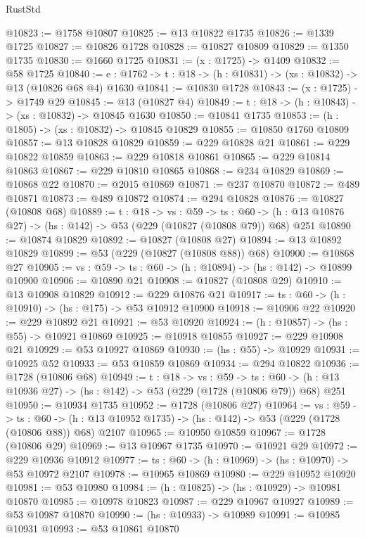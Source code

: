 \begin{lexlean}{RustStd}
\begin{coremodule}
@10823 := @1758 @10807
@10825 := @13 @10822 @1735
@10826 := @1339 @1725
@10827 := @10826 @1728
@10828 := @10827 @10809
@10829 := @1350 @1735
@10830 := @1660 @1725
@10831 := (x : @1725) -> @1409
@10832 := @58 @1725
@10840 := {e : @1762} -> {t : @18} -> (h : @10831) -> (xs : @10832) -> @13 (@10826 @68 @4) @1630
@10841 := @10830 @1728
@10843 := (x : @1725) -> @1749 @29
@10845 := @13 (@10827 @4)
@10849 := {t : @18} -> (h : @10843) -> (xs : @10832) -> @10845 @1630
@10850 := @10841 @1735
@10853 := (h : @1805) -> (xs : @10832) -> @10845 @10829
@10855 := @10850 @1760 @10809
@10857 := @13 @10828 @10829
@10859 := @229 @10828 @21
@10861 := @229 @10822 @10859
@10863 := @229 @10818 @10861
@10865 := @229 @10814 @10863
@10867 := @229 @10810 @10865
@10868 := @234 @10829
@10869 := @10868 @22
@10870 := @2015 @10869
@10871 := @237 @10870
@10872 := @489 @10871
@10873 := @489 @10872
@10874 := @294 @10828
@10876 := @10827 (@10808 @68)
@10889 := {t : @18} ->
  {vs : @59} ->
  {ts : @60} -> (h : @13 @10876 @27) -> (hs : @142) -> @53 (@229 (@10827 (@10808 @79)) @68) @251
@10890 := @10874 @10829
@10892 := @10827 (@10808 @27)
@10894 := @13 @10892 @10829
@10899 := @53 (@229 (@10827 (@10808 @88)) @68)
@10900 := @10868 @27
@10905 := {vs : @59} -> {ts : @60} -> (h : @10894) -> (hs : @142) -> @10899 @10900
@10906 := @10890 @21
@10908 := @10827 (@10808 @29)
@10910 := @13 @10908 @10829
@10912 := @229 @10876 @21
@10917 := {ts : @60} -> (h : @10910) -> (hs : @175) -> @53 @10912 @10900
@10918 := @10906 @22
@10920 := @229 @10892 @21
@10921 := @53 @10920
@10924 := (h : @10857) -> (hs : @55) -> @10921 @10869
@10925 := @10918 @10855
@10927 := @229 @10908 @21
@10929 := @53 @10927 @10869
@10930 := (hs : @55) -> @10929
@10931 := @10925 @52
@10933 := @53 @10859 @10869
@10934 := @294 @10822
@10936 := @1728 (@10806 @68)
@10949 := {t : @18} ->
  {vs : @59} ->
  {ts : @60} -> (h : @13 @10936 @27) -> (hs : @142) -> @53 (@229 (@1728 (@10806 @79)) @68) @251
@10950 := @10934 @1735
@10952 := @1728 (@10806 @27)
@10964 := {vs : @59} ->
  {ts : @60} -> (h : @13 @10952 @1735) -> (hs : @142) -> @53 (@229 (@1728 (@10806 @88)) @68) @2107
@10965 := @10950 @10859
@10967 := @1728 (@10806 @29)
@10969 := @13 @10967 @1735
@10970 := @10921 @29
@10972 := @229 @10936 @10912
@10977 := {ts : @60} -> (h : @10969) -> (hs : @10970) -> @53 @10972 @2107
@10978 := @10965 @10869
@10980 := @229 @10952 @10920
@10981 := @53 @10980
@10984 := (h : @10825) -> (hs : @10929) -> @10981 @10870
@10985 := @10978 @10823
@10987 := @229 @10967 @10927
@10989 := @53 @10987 @10870
@10990 := (hs : @10933) -> @10989
@10991 := @10985 @10931
@10993 := @53 @10861 @10870

\end{coremodule}
\end{lexlean}
